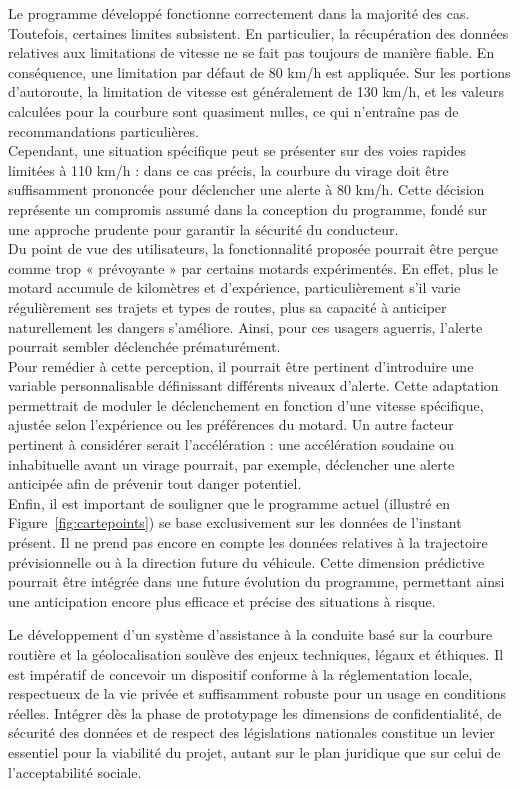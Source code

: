 Le programme développé fonctionne correctement dans la majorité des cas. Toutefois, certaines limites subsistent. En particulier, la récupération des données relatives aux limitations de vitesse ne se fait pas toujours de manière fiable. En conséquence, une limitation par défaut de 80 km/h est appliquée. Sur les portions d’autoroute, la limitation de vitesse est généralement de 130 km/h, et les valeurs calculées pour la courbure sont quasiment nulles, ce qui n’entraîne pas de recommandations particulières.\\
Cependant, une situation spécifique peut se présenter sur des voies rapides limitées à 110 km/h : dans ce cas précis, la courbure du virage doit être suffisamment prononcée pour déclencher une alerte à 80 km/h. Cette décision représente un compromis assumé dans la conception du programme, fondé sur une approche prudente pour garantir la sécurité du conducteur.\\
Du point de vue des utilisateurs, la fonctionnalité proposée pourrait être perçue comme trop « prévoyante » par certains motards expérimentés. En effet, plus le motard accumule de kilomètres et d'expérience, particulièrement s'il varie régulièrement ses trajets et types de routes, plus sa capacité à anticiper naturellement les dangers s'améliore. Ainsi, pour ces usagers aguerris, l'alerte pourrait sembler déclenchée prématurément.\\
Pour remédier à cette perception, il pourrait être pertinent d’introduire une variable personnalisable définissant différents niveaux d’alerte. Cette adaptation permettrait de moduler le déclenchement en fonction d’une vitesse spécifique, ajustée selon l’expérience ou les préférences du motard. Un autre facteur pertinent à considérer serait l'accélération : une accélération soudaine ou inhabituelle avant un virage pourrait, par exemple, déclencher une alerte anticipée afin de prévenir tout danger potentiel.\\
Enfin, il est important de souligner que le programme actuel (illustré en Figure~\ref{fig:cartepoints}) se base exclusivement sur les données de l’instant présent. Il ne prend pas encore en compte les données relatives à la trajectoire prévisionnelle ou à la direction future du véhicule. Cette dimension prédictive pourrait être intégrée dans une future évolution du programme, permettant ainsi une anticipation encore plus efficace et précise des situations à risque.

\vspace{0.5cm}
Le développement d’un système d’assistance à la conduite basé sur la courbure routière et la géolocalisation soulève des enjeux techniques, légaux et éthiques. Il est impératif de concevoir un dispositif conforme à la réglementation locale, respectueux de la vie privée et suffisamment robuste pour un usage en conditions réelles. Intégrer dès la phase de prototypage les dimensions de confidentialité, de sécurité des données et de respect des législations nationales constitue un levier essentiel pour la viabilité du projet, autant sur le plan juridique que sur celui de l’acceptabilité sociale.


